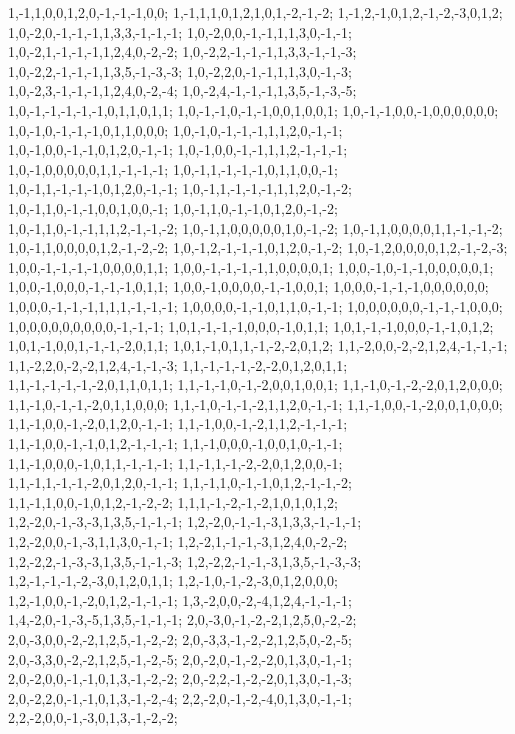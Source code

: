 {{1,-1,1,0,0,1,2,0,-1,-1,-1,0,0; 1,-1,1,1,0,1,2,1,0,1,-2,-1,-2; 1,-1,2,-1,0,1,2,-1,-2,-3,0,1,2; 1,0,-2,0,-1,-1,-1,1,3,3,-1,-1,-1; 1,0,-2,0,0,-1,-1,1,1,3,0,-1,-1; 1,0,-2,1,-1,-1,-1,1,2,4,0,-2,-2; 1,0,-2,2,-1,-1,-1,1,3,3,-1,-1,-3; 1,0,-2,2,-1,-1,-1,1,3,5,-1,-3,-3; 1,0,-2,2,0,-1,-1,1,1,3,0,-1,-3; 1,0,-2,3,-1,-1,-1,1,2,4,0,-2,-4; 1,0,-2,4,-1,-1,-1,1,3,5,-1,-3,-5; 1,0,-1,-1,-1,-1,-1,0,1,1,0,1,1;
1,0,-1,-1,0,-1,-1,0,0,1,0,0,1; 1,0,-1,-1,0,0,-1,0,0,0,0,0,0; 1,0,-1,0,-1,-1,-1,0,1,1,0,0,0; 1,0,-1,0,-1,-1,-1,1,1,2,0,-1,-1; 1,0,-1,0,0,-1,-1,0,1,2,0,-1,-1; 1,0,-1,0,0,-1,-1,1,1,2,-1,-1,-1; 1,0,-1,0,0,0,0,0,1,1,-1,-1,-1; 1,0,-1,1,-1,-1,-1,0,1,1,0,0,-1; 1,0,-1,1,-1,-1,-1,0,1,2,0,-1,-1; 1,0,-1,1,-1,-1,-1,1,1,2,0,-1,-2; 1,0,-1,1,0,-1,-1,0,0,1,0,0,-1; 1,0,-1,1,0,-1,-1,0,1,2,0,-1,-2;
1,0,-1,1,0,-1,-1,1,1,2,-1,-1,-2; 1,0,-1,1,0,0,0,0,0,1,0,-1,-2; 1,0,-1,1,0,0,0,0,1,1,-1,-1,-2; 1,0,-1,1,0,0,0,0,1,2,-1,-2,-2; 1,0,-1,2,-1,-1,-1,0,1,2,0,-1,-2; 1,0,-1,2,0,0,0,0,1,2,-1,-2,-3; 1,0,0,-1,-1,-1,-1,0,0,0,0,1,1; 1,0,0,-1,-1,-1,-1,1,0,0,0,0,1; 1,0,0,-1,0,-1,-1,0,0,0,0,0,1; 1,0,0,-1,0,0,0,-1,-1,-1,0,1,1; 1,0,0,-1,0,0,0,0,-1,-1,0,0,1; 1,0,0,0,-1,-1,-1,0,0,0,0,0,0;
1,0,0,0,-1,-1,-1,1,1,1,-1,-1,-1; 1,0,0,0,0,-1,-1,0,1,1,0,-1,-1; 1,0,0,0,0,0,0,-1,-1,-1,0,0,0; 1,0,0,0,0,0,0,0,0,0,-1,-1,-1; 1,0,1,-1,-1,-1,0,0,0,-1,0,1,1; 1,0,1,-1,-1,0,0,0,-1,-1,0,1,2; 1,0,1,-1,0,0,1,-1,-1,-2,0,1,1; 1,0,1,-1,0,1,1,-1,-2,-2,0,1,2; 1,1,-2,0,0,-2,-2,1,2,4,-1,-1,-1; 1,1,-2,2,0,-2,-2,1,2,4,-1,-1,-3; 1,1,-1,-1,-1,-2,-2,0,1,2,0,1,1; 1,1,-1,-1,-1,-1,-2,0,1,1,0,1,1;
1,1,-1,-1,0,-1,-2,0,0,1,0,0,1; 1,1,-1,0,-1,-2,-2,0,1,2,0,0,0; 1,1,-1,0,-1,-1,-2,0,1,1,0,0,0; 1,1,-1,0,-1,-1,-2,1,1,2,0,-1,-1; 1,1,-1,0,0,-1,-2,0,0,1,0,0,0; 1,1,-1,0,0,-1,-2,0,1,2,0,-1,-1; 1,1,-1,0,0,-1,-2,1,1,2,-1,-1,-1; 1,1,-1,0,0,-1,-1,0,1,2,-1,-1,-1; 1,1,-1,0,0,0,-1,0,0,1,0,-1,-1; 1,1,-1,0,0,0,-1,0,1,1,-1,-1,-1; 1,1,-1,1,-1,-2,-2,0,1,2,0,0,-1; 1,1,-1,1,-1,-1,-2,0,1,2,0,-1,-1;
1,1,-1,1,0,-1,-1,0,1,2,-1,-1,-2; 1,1,-1,1,0,0,-1,0,1,2,-1,-2,-2; 1,1,1,-1,-2,-1,-2,1,0,1,0,1,2; 1,2,-2,0,-1,-3,-3,1,3,5,-1,-1,-1; 1,2,-2,0,-1,-1,-3,1,3,3,-1,-1,-1; 1,2,-2,0,0,-1,-3,1,1,3,0,-1,-1; 1,2,-2,1,-1,-1,-3,1,2,4,0,-2,-2; 1,2,-2,2,-1,-3,-3,1,3,5,-1,-1,-3; 1,2,-2,2,-1,-1,-3,1,3,5,-1,-3,-3; 1,2,-1,-1,-1,-2,-3,0,1,2,0,1,1; 1,2,-1,0,-1,-2,-3,0,1,2,0,0,0; 1,2,-1,0,0,-1,-2,0,1,2,-1,-1,-1;
1,3,-2,0,0,-2,-4,1,2,4,-1,-1,-1; 1,4,-2,0,-1,-3,-5,1,3,5,-1,-1,-1; 2,0,-3,0,-1,-2,-2,1,2,5,0,-2,-2; 2,0,-3,0,0,-2,-2,1,2,5,-1,-2,-2; 2,0,-3,3,-1,-2,-2,1,2,5,0,-2,-5; 2,0,-3,3,0,-2,-2,1,2,5,-1,-2,-5; 2,0,-2,0,-1,-2,-2,0,1,3,0,-1,-1; 2,0,-2,0,0,-1,-1,0,1,3,-1,-2,-2; 2,0,-2,2,-1,-2,-2,0,1,3,0,-1,-3; 2,0,-2,2,0,-1,-1,0,1,3,-1,-2,-4; 2,2,-2,0,-1,-2,-4,0,1,3,0,-1,-1; 2,2,-2,0,0,-1,-3,0,1,3,-1,-2,-2;
}}
